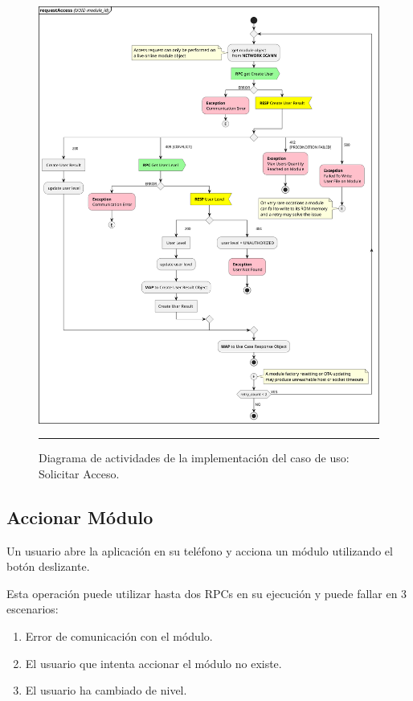 \begin{figure}[htbp]
	\centering
	\includegraphics[width=\textwidth]{Figures/iter1/ACT_request_ink.png}
	\rule{35em}{1pt}
	\caption[Class Diagram]{Diagrama de actividades de la implementación del caso de uso: Solicitar Acceso.}
	\label{fig:act_request}
\end{figure}

\subsection{Accionar Módulo}
Un usuario abre la aplicación en su teléfono y acciona un módulo utilizando el botón deslizante.

Esta operación puede utilizar hasta dos RPCs en su ejecución y puede fallar en 3 escenarios:

\begin{enumerate}
	\item Error de comunicación con el módulo.
	\item El usuario que intenta accionar el módulo no existe.
	\item El usuario ha cambiado de nivel.
\end{enumerate}

